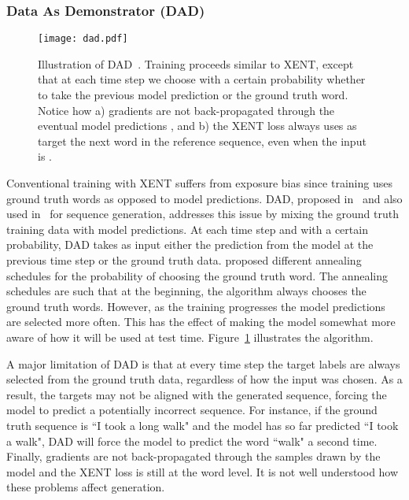 \documentclass{article} \usepackage{iclr2016_conference,times}
\begin{document}
\subsubsection{Data As Demonstrator (DAD)} \label{model-dad}
\begin{figure}[!t]
\begin{center}
\texttt{[image: dad.pdf]}
\end{center}
\caption{Illustration of DAD~\citep{sbengio-nips2015,
    dad}. Training
  proceeds similar to XENT, except that at each time step we choose with
  a certain probability whether to take the previous model prediction or
  the ground truth word. Notice how a) gradients are not
  back-propagated through the eventual model predictions , and
  b) the XENT loss always uses as target the next word in the reference
  sequence, even when the input is .}
\label{fig:dad}
\end{figure}
Conventional training with XENT suffers from exposure bias since  
training uses ground truth words as opposed to model predictions.
DAD, proposed in~\citep{dad} and also used in~\citep{sbengio-nips2015} for sequence generation, addresses this issue by mixing the ground truth training data with model predictions.
At each time step and with a certain probability, DAD takes as input either the prediction from the model at the previous time step or the ground truth data. \citet{sbengio-nips2015} proposed  different 
annealing schedules for the probability of choosing the ground truth word. The annealing schedules are such that at the beginning, the algorithm always chooses the ground truth words. However, as the training progresses the model predictions are selected more often. 
This has the effect of making the model somewhat more aware of how it will be used at test time. Figure~\ref{fig:dad} illustrates the algorithm. 

A major limitation of DAD is that at every time step the target labels are always selected from the ground truth data,  regardless of how the input was chosen. As a result, the targets may not be aligned with the generated sequence, forcing the model to predict a potentially incorrect sequence. 
For instance, if the ground truth sequence is ``I took a long
walk" and the model has so far predicted ``I took a walk", DAD will force the model to predict the word ``walk" a second time. 
Finally, gradients are not back-propagated through the samples drawn by the model and the XENT loss is still at the word level. 
It is not well understood how these problems affect generation.
\end{document}
